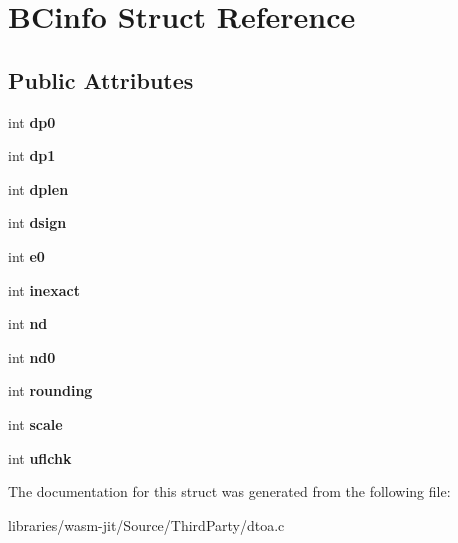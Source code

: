 \hypertarget{struct_b_cinfo}{}\section{B\+Cinfo Struct Reference}
\label{struct_b_cinfo}
\subsection*{Public Attributes}
\begin{DoxyCompactItemize}
\item 
\mbox{\label{struct_b_cinfo_a3964ec38e0c314af352712868f2dd704}} 
int {\bfseries dp0}
\item 
\mbox{\label{struct_b_cinfo_abecc5c5f902ebd32160dfdf76d7d6547}} 
int {\bfseries dp1}
\item 
\mbox{\label{struct_b_cinfo_a7dab2f1429125553774f6042e8411b1c}} 
int {\bfseries dplen}
\item 
\mbox{\label{struct_b_cinfo_af31a6e71daa4846ff10effee255210eb}} 
int {\bfseries dsign}
\item 
\mbox{\label{struct_b_cinfo_a3465f7cb1203532a3dc29c5a01e05526}} 
int {\bfseries e0}
\item 
\mbox{\label{struct_b_cinfo_acac9270192035aab53d5832fb681040a}} 
int {\bfseries inexact}
\item 
\mbox{\label{struct_b_cinfo_ac189da9f6f82f8846017c40e5872e4a7}} 
int {\bfseries nd}
\item 
\mbox{\label{struct_b_cinfo_a9d30accd41a03e88ebd52591258b76fa}} 
int {\bfseries nd0}
\item 
\mbox{\label{struct_b_cinfo_af42ca3177f8bd75dfe6435461332e748}} 
int {\bfseries rounding}
\item 
\mbox{\label{struct_b_cinfo_a59b720f0388e80e21b950723aa53b56e}} 
int {\bfseries scale}
\item 
\mbox{\label{struct_b_cinfo_a637b7e41de9291f100fdcc60267c222b}} 
int {\bfseries uflchk}
\end{DoxyCompactItemize}


The documentation for this struct was generated from the following file\+:\begin{DoxyCompactItemize}
\item 
libraries/wasm-\/jit/\+Source/\+Third\+Party/dtoa.\+c\end{DoxyCompactItemize}
